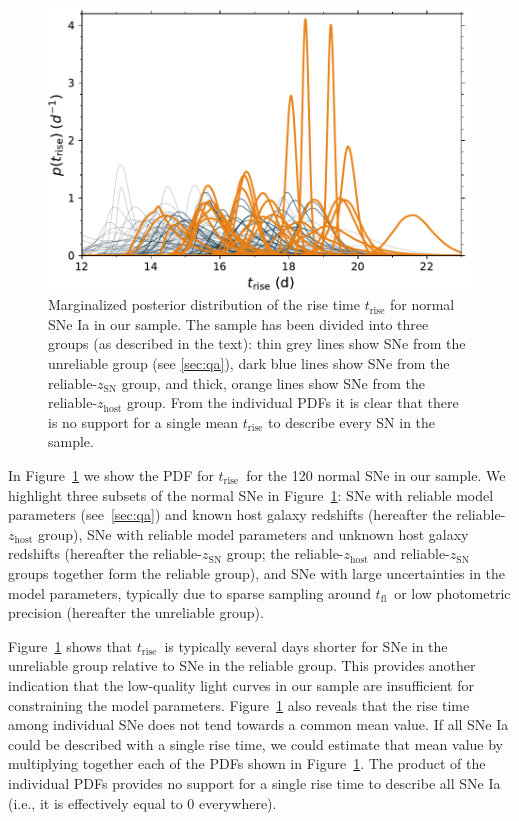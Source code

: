 \documentclass[twocolumn]{./aastex63}
\newcommand{\tfl}{$t_\mathrm{fl}$}
\newcommand{\trise}{$t_\mathrm{rise}$}
\begin{document}
\begin{figure}
    \centering
    \includegraphics[width=1\linewidth]{./figures/rise_time.pdf}
    \caption{Marginalized posterior distribution of the rise time
    $t_\mathrm{rise}$ for normal SNe Ia in our sample. The sample has been
    divided into three groups (as described in the text): thin grey lines show
    SNe from the unreliable group (see \ref{sec:qa}), dark blue lines show SNe
    from the reliable-$z_\mathrm{SN}$ group, and thick, orange lines show SNe
    from the reliable-$z_\mathrm{host}$ group. From the individual PDFs it is
    clear that there is no support for a single mean $t_\mathrm{rise}$ to
    describe every SN in the sample.}
    \label{fig:rise_time}
\end{figure}

In Figure~\ref{fig:rise_time} we show the PDF for \trise\ for the 120 normal
SNe in our sample. We highlight three subsets of the normal SNe in
Figure~\ref{fig:rise_time}: SNe with reliable model parameters
(see~\ref{sec:qa}) and known host galaxy redshifts (hereafter the
reliable-$z_\mathrm{host}$ group), SNe with reliable model parameters and
unknown host galaxy redshifts (hereafter the reliable-$z_\mathrm{SN}$ group;
the reliable-$z_\mathrm{host}$ and reliable-$z_\mathrm{SN}$ groups together
form the reliable group), and SNe with large uncertainties in the model
parameters, typically due to sparse sampling around \tfl\ or low photometric
precision (hereafter the unreliable group).

Figure~\ref{fig:rise_time} shows that \trise\ is typically several days
shorter for SNe in the unreliable group relative to SNe in the reliable group.
This provides another indication that the low-quality light curves in our
sample are insufficient for constraining the model parameters.
Figure~\ref{fig:rise_time} also reveals that the rise time among individual
SNe does not tend towards a common mean value. If all SNe Ia could be
described with a single rise time, we could estimate that mean value by
multiplying together each of the PDFs shown in Figure~\ref{fig:rise_time}. The
product of the individual PDFs provides no support for a single rise time to
describe all SNe Ia (i.e., it is effectively equal to 0 everywhere).
\end{document}
